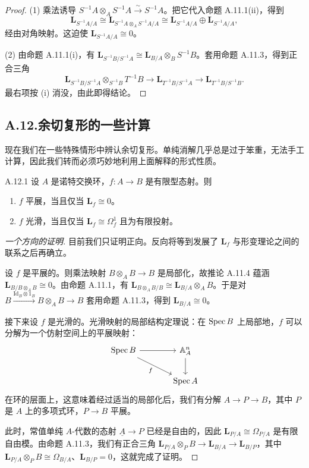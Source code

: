 \begin{proof}
(1) 乘法诱导 $S^{-1}A\otimes_A S^{-1}A\xrightarrow{\sim}S^{-1}A$。把它代入命题 A.11.1(ii)，得到
\[
\mathbf L_{S^{-1}A/A}\cong\mathbf L_{S^{-1}A\otimes_AS^{-1}A/A}\cong\mathbf L_{S^{-1}A/A}\oplus\mathbf L_{S^{-1}A/A},
\]
经由对角映射。这迫使 $\mathbf L_{S^{-1}A/A}\cong0$。

(2) 由命题 A.11.1(i)，有 $\mathbf L_{S^{-1}B/S^{-1}A}\cong\mathbf L_{B/A}\otimes_B S^{-1}B$。套用命题 A.11.3，得到正合三角
\[
\mathbf L_{S^{-1}B/S^{-1}A}\otimes_{S^{-1}B}T^{-1}B\to\mathbf L_{T^{-1}B/S^{-1}A}\to\mathbf L_{T^{-1}B/S^{-1}B}.
\]
最右项按 (i) 消没，由此即得结论。
\end{proof}

\subsection*{A.12.\quad 余切复形的一些计算}

现在我们在一些特殊情形中辨认余切复形。单纯消解几乎总是过于笨重，无法手工计算，因此我们转而必须巧妙地利用上面解释的形式性质。

\begin{prop}{A.12.1}\label{thm:a6-07-24}
设 $A$ 是诺特交换环，$f\colon A\to B$ 是有限型态射。则
\begin{enumerate}[(1)]
\item $f$ 平展，当且仅当 $\mathbf L_f\cong0$。
\item $f$ 光滑，当且仅当 $\mathbf L_f\cong\Omega^1_f$ 且为有限投射。
\end{enumerate}
\end{prop}

\begin{proof}[一个方向的证明]
目前我们只证明正向。反向将等到发展了 $\mathbf L_f$ 与形变理论之间的联系之后再确立。

设 $f$ 是平展的。则乘法映射 $B\otimes_A B\to B$ 是局部化，故推论 A.11.4 蕴涵 $\mathbf L_{B/B\otimes_A B}\cong0$。由命题 A.11.1，有 $\mathbf L_{B\otimes_A B/B}\cong\mathbf L_{B/A}\otimes_A B$。于是对 $B\xrightarrow{\mathrm{Id}_B\otimes1_B}B\otimes_A B\to B$ 套用命题 A.11.3，得到 $\mathbf L_{B/A}\cong0$。

接下来设 $f$ 是光滑的。光滑映射的局部结构定理说：在 $\operatorname{Spec} B$ 上局部地，$f$ 可以分解为一个仿射空间上的平展映射：
\[
\begin{tikzcd}[column sep=3.6em, row sep=2em]
\Spec B \arrow[r] \arrow[dr, "f"'] & \mathbb A^n_A \arrow[d] \\
& \Spec A
\end{tikzcd}
\]
在环的层面上，这意味着经过适当的局部化后，我们有分解 $A\to P\to B$，其中 $P$ 是 $A$ 上的多项式环，$P\to B$ 平展。

此时，常值单纯 $A$-代数的态射 $\underline A\to P$ 已经是自由的，因此 $\mathbf L_{P/A}\cong\Omega_{P/A}$ 是有限自由模。由命题 A.11.3，我们有正合三角 $\mathbf L_{P/A}\otimes_P B\to\mathbf L_{B/A}\to\mathbf L_{B/P}$，其中 $\mathbf L_{P/A}\otimes_P B\cong\Omega_{B/A}$、$\mathbf L_{B/P}=0$，这就完成了证明。
\end{proof}

